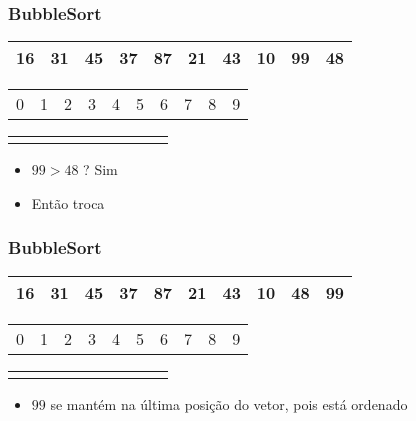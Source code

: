 \documentclass{beamer}
\begin{document}
\begin{frame}
    \frametitle{BubbleSort}
    \begin{center}
        \begin{table}
            \begin{tabular}{| p{0.25cm} | p{0.25cm} | p{0.25cm} | p{0.25cm} | p{0.25cm} | p{0.25cm} | p{0.25cm} | p{0.25cm} | p{0.25cm} | p{0.25cm} |}
                \hline
                16 & 31 & 45 & 37 & 87 & 21 & 43 & 10 & 99 & 48 \\ \hline
            \end{tabular}
            \begin{tabular}{p{0.25cm} p{0.25cm} p{0.25cm} p{0.25cm} p{0.25cm} p{0.25cm} p{0.25cm} p{0.25cm} p{0.25cm} p{0.25cm}}
                0 & 1 & 2 & 3 & 4 & 5 & 6 & 7 & 8 & 9
            \end{tabular}
            \begin{tabular}{p{0.25cm} p{0.25cm} p{0.25cm} p{0.25cm} p{0.25cm} p{0.25cm} p{0.25cm} p{0.25cm} p{0.25cm} p{0.25cm}}
                & & & & & & & & \color{red}{$\uparrow$} & \color{blue}{$\uparrow$}
            \end{tabular}
        \end{table}
	\end{center}
    \begin{itemize}[<+->]
        \item $99 > 48$ ? Sim
        \item Então troca
    \end{itemize}
\end{frame}

\begin{frame}
    \frametitle{BubbleSort}
    \begin{center}
        \begin{table}
            \begin{tabular}{| p{0.25cm} | p{0.25cm} | p{0.25cm} | p{0.25cm} | p{0.25cm} | p{0.25cm} | p{0.25cm} | p{0.25cm} | p{0.25cm} | p{0.25cm} |}
                \hline
                16 & 31 & 45 & 37 & 87 & 21 & 43 & 10 & 48 & 99 \\ \hline
            \end{tabular}
            \begin{tabular}{p{0.25cm} p{0.25cm} p{0.25cm} p{0.25cm} p{0.25cm} p{0.25cm} p{0.25cm} p{0.25cm} p{0.25cm} p{0.25cm}}
                0 & 1 & 2 & 3 & 4 & 5 & 6 & 7 & 8 & 9
            \end{tabular}
            \begin{tabular}{p{0.25cm} p{0.25cm} p{0.25cm} p{0.25cm} p{0.25cm} p{0.25cm} p{0.25cm} p{0.25cm} p{0.25cm} p{0.25cm}}
                & & & & & & & & & \color{red}{$\uparrow$}
            \end{tabular}
        \end{table}
	\end{center}
    \begin{itemize}
        \item $99$ se mantém na última posição do vetor, pois está ordenado
    \end{itemize}
\end{frame}
\end{document}
